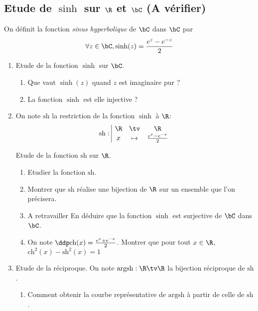 
\subsection{Etude de $\sinh$ sur $\R$ et $\bC$ (A vérifier)} 


\begin{exercice}
On définit la fonction \emph{sinus hyperbolique} de  $\bC$ dans $\bC$ par  
$$\forall z\in \bC, \sinh(z) =\frac{e^z -e^{-z}}{2}$$


\begin{enumerate}
\item Etude de la fonction $\sinh$ sur $\bC$.
\begin{enumerate}
\item Que vaut $\sinh(z)$ quand $z$ est imaginaire pur ? 
\item La fonction $\sinh$ est elle injective ? 
\end{enumerate}

\item  On note $\mathrm{sh}$ la restriction de la fonction $\sinh$ à $\R$:
$$\mathrm{sh} :  \begin{array}{|ccc}
\R &\tv& \R\\
x &\mapsto & \frac{e^x -e^{-x}}{2}
\end{array}$$ 

Etude de la fonction $\mathrm{sh}$ sur $\R$. 
\begin{enumerate}
\item Etudier la fonction $\mathrm{sh}$. 
\item Montrer que $\mathrm{sh}$ réalise une bijection de $\R$ sur un ensemble que l'on précisera.
\item \warning A retravailler \warning En déduire que la fonction $\sinh$ est surjective  de $\bC$ dans $\bC$.  
\item On note $\ddp \mathrm{ch}(x)  =\frac{e^x +e^{-x}}{2}$. Montrer que pour tout $x\in \R$, $\mathrm{ch}^2(x)-\mathrm{sh}^2(x)=1$
\end{enumerate}
\item Etude de la réciproque. 
On note $\mathrm{argsh} : \R \tv \R$ la bijection réciproque de $\mathrm{sh}$. 
\begin{enumerate}
\item  Comment  obtenir la courbe représentative de $\mathrm{argsh} $ à partir de celle de $\mathrm{sh}$. 


\end{enumerate}
\end{enumerate}
\end{exercice}
